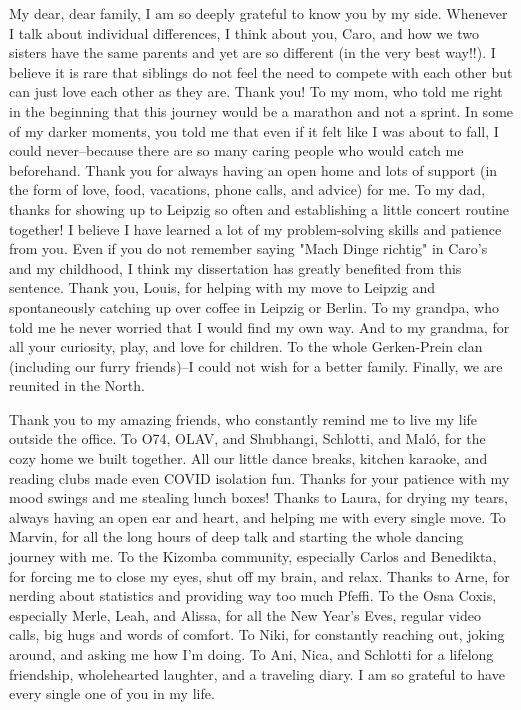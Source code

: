 \documentclass[
]{scrbook}
\begin{document}
\begin{small}
My dear, dear family, I am so deeply grateful to know you by my side. Whenever I talk about individual differences, I think about you, Caro, and how we two sisters have the same parents and yet are so different (in the very best way!!). I believe it is rare that siblings do not feel the need to compete with each other but can just love each other as they are. Thank you! To my mom, who told me right in the beginning that this journey would be a marathon and not a sprint. In some of my darker moments, you told me that even if it felt like I was about to fall, I could never\thinspace --\thinspace because there are so many caring people who would catch me beforehand. Thank you for always having an open home and lots of support (in the form of love, food, vacations, phone calls, and advice) for me. To my dad, thanks for showing up to Leipzig so often and establishing a little concert routine together! I believe I have learned a lot of my problem-solving skills and patience from you. Even if you do not remember saying "Mach Dinge richtig" in Caro's and my childhood, I think my dissertation has greatly benefited from this sentence. Thank you, Louis, for helping with my move to Leipzig and spontaneously catching up over coffee in Leipzig or Berlin. To my grandpa, who told me he never worried that I would find my own way. And to my grandma, for all your curiosity, play, and love for children. To the whole Gerken-Prein clan (including our furry friends)\thinspace --\thinspace I could not wish for a better family. Finally, we are reunited in the North.

Thank you to my amazing friends, who constantly remind me to live my life outside the office. To O74, OLAV, and Shubhangi, Schlotti, and Maló, for the cozy home we built together. All our little dance breaks, kitchen karaoke, and reading clubs made even COVID isolation fun. Thanks for your patience with my mood swings and me stealing lunch boxes! Thanks to Laura, for drying my tears, always having an open ear and heart, and helping me with every single move. To Marvin, for all the long hours of deep talk and starting the whole dancing journey with me. To the Kizomba community, especially Carlos and Benedikta, for forcing me to close my eyes, shut off my brain, and relax. Thanks to Arne, for nerding about statistics and providing way too much Pfeffi. To the Osna Coxis, especially Merle, Leah, and Alissa, for all the New Year's Eves, regular video calls, big hugs and words of comfort. To Niki, for constantly reaching out, joking around, and asking me how I'm doing. To Ani, Nica, and Schlotti for a lifelong friendship, wholehearted laughter, and a traveling diary. I am so grateful to have every single one of you in my life.


\end{small}
\end{document}
